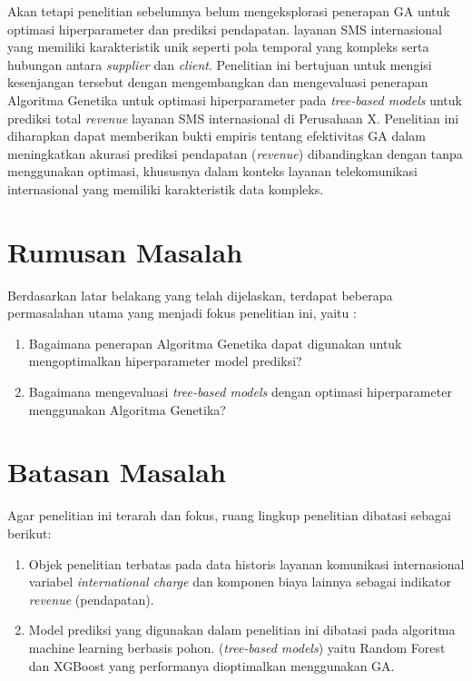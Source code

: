     Akan tetapi penelitian sebelumnya belum mengeksplorasi penerapan GA untuk optimasi hiperparameter dan prediksi pendapatan. layanan SMS internasional yang memiliki karakteristik unik seperti  pola temporal yang kompleks serta hubungan antara \textit{supplier} dan \textit{client}. Penelitian ini bertujuan untuk mengisi kesenjangan tersebut dengan mengembangkan dan mengevaluasi penerapan Algoritma Genetika untuk optimasi hiperparameter pada \textit{tree-based models} untuk prediksi total \textit{revenue} layanan SMS internasional di Perusahaan X. Penelitian ini diharapkan dapat memberikan bukti empiris tentang efektivitas GA dalam meningkatkan akurasi prediksi pendapatan (\textit{revenue}) dibandingkan dengan tanpa menggunakan optimasi, khususnya dalam konteks layanan telekomunikasi internasional yang memiliki karakteristik data kompleks.
    
    \section{Rumusan Masalah}\label{sec:problem}

    Berdasarkan latar belakang yang telah dijelaskan, terdapat beberapa permasalahan utama yang menjadi fokus penelitian ini, yaitu :
        \begin{enumerate}
 
            \item Bagaimana penerapan Algoritma Genetika dapat digunakan untuk mengoptimalkan hiperparameter model prediksi?

            \item Bagaimana mengevaluasi \textit{tree-based models} dengan optimasi hiperparameter menggunakan Algoritma Genetika?
        \end{enumerate}

    \section{Batasan Masalah}\label{sec:limitation}
    Agar penelitian ini terarah dan fokus, ruang lingkup penelitian dibatasi sebagai berikut:
        \begin{enumerate}
            \item Objek penelitian terbatas pada data historis layanan komunikasi internasional  variabel \textit{international charge} dan komponen biaya lainnya sebagai indikator \textit{revenue} (pendapatan).
            \item Model prediksi yang digunakan dalam penelitian ini dibatasi pada algoritma  machine learning berbasis pohon. (\textit{tree-based models}) yaitu Random Forest dan XGBoost yang performanya dioptimalkan menggunakan GA.
        \end{enumerate}

